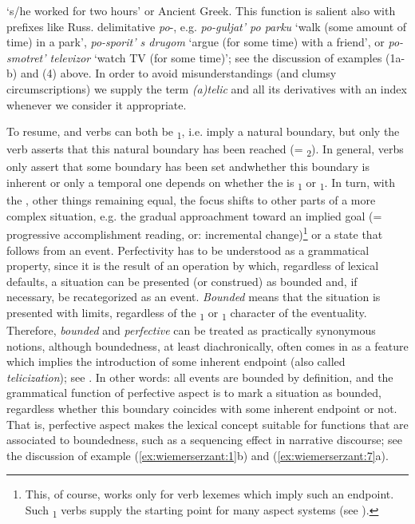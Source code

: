 \documentclass[output=paper]{langsci/langscibook}
\begin{document}
‘s/he worked for two hours’ or Ancient Greek. This function is salient also with prefixes like Russ. delimitative \textit{po}-, e.g. \textit{po-guljat’ po parku} ‘walk (some amount of time) in a park’, \textit{po-sporit’ s drugom} ‘argue (for some time) with a friend’, or \textit{po-smotret’ televizor} ‘watch TV (for some time)’; see the discussion of examples (1a-b) and (4) above. In order to avoid misunderstandings (and clumsy circumscriptions) we supply the term \textit{(a)telic} and all its derivatives with an index whenever we consider it appropriate.

To resume,  and  verbs can both be \textsubscript{1}, i.e. imply a natural boundary, but only the  verb asserts that this natural boundary has been reached (= \textsubscript{2}). In general,  verbs only assert that some boundary has been set andwhether this boundary is inherent or only a temporal one depends on whether the  is \textsubscript{1} or \textsubscript{1}. In turn, with the , other things remaining equal, the focus shifts to other parts of a more complex situation, e.g. the gradual approachment toward an implied goal (= progressive accomplishment reading, or: incremental change)\footnote{This, of course, works only for verb lexemes which imply such an endpoint. Such \textsubscript{1} verbs supply the starting point for many aspect systems (see ).} or a state that follows from an event. Perfectivity has to be understood as a grammatical property, since it is the result of an operation by which, regardless of lexical defaults, a situation can be presented (or construed) as bounded and, if necessary, be recategorized as an event. \textit{Bounded} means that the situation is presented with limits, regardless of the \textsubscript{1} or \textsubscript{1} character of the eventuality. Therefore, \textit{bounded} and \textit{perfective} can be treated as practically synonymous notions, although boundedness, at least diachronically, often comes in as a feature which implies the introduction of some inherent endpoint (also called \textit{telicization}); see . In other words: all events are bounded by definition, and the grammatical function of perfective aspect is to mark a situation as bounded, regardless whether this boundary coincides with some inherent endpoint or not. That is, perfective aspect makes the lexical concept suitable for functions that are associated to boundedness, such as a sequencing effect in narrative discourse; see the discussion of example (\ref{ex:wiemerserzant:1}b) and (\ref{ex:wiemerserzant:7}a).
\end{document}
